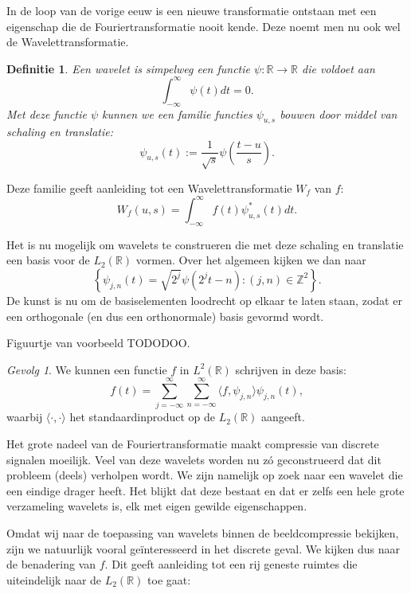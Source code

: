 \documentclass[11pt]{report}
\newcommand{\R}{\mathbb{R}}
\newcommand{\Z}{\mathbb{Z}}
\theoremstyle{plain}
\newtheorem*{definitie}{Definitie}
\theoremstyle{remark}
\newtheorem*{gevolg}{Gevolg}
\begin{document}
In de loop van de vorige eeuw is een nieuwe transformatie ontstaan met een eigenschap die de Fouriertransformatie nooit kende. Deze noemt men nu ook wel de Wavelettransformatie.

\begin{definitie}
Een wavelet is simpelweg een functie $\psi: \R \to \R$ die voldoet aan
\[
  \int_{-\infty}^{\infty} \psi(t) dt = 0.
\]
Met deze functie $\psi$ kunnen we een familie functies $\psi_{u,s}$ bouwen door middel van schaling en translatie:
\[
  \psi_{u,s}(t) := \frac{1}{\sqrt{s}} \psi\left(\frac{t-u}{s}\right).
\]
\end{definitie}

Deze familie geeft aanleiding tot een Wavelettransformatie $W_f$ van $f$:
\[
  W_f(u,s) = \int_{-\infty}^\infty f(t) \psi^*_{u,s}(t) dt.
\]

Het is nu mogelijk om wavelets te construeren die met deze schaling en translatie een basis voor de $L_2(\R)$ vormen. Over het algemeen kijken we dan naar
\[
  \left\{ \psi_{j,n}(t) = \sqrt{2^j} \psi\left( 2^j t - n\right) : (j,n) \in \Z^2 \right\}.
\]
De kunst is nu om de basiselementen loodrecht op elkaar te laten staan, zodat er een orthogonale (en dus een orthonormale) basis gevormd wordt. 

Figuurtje van voorbeeld TODODOO.

\begin{gevolg}We kunnen een functie $f$ in $L^2(\R)$ schrijven in deze basis:
\[
  f(t) = \sum_{j=-\infty}^{\infty} \sum_{n=-\infty}^{\infty} \langle f, \psi_{j,n} \rangle \psi_{j,n}(t),
\]
waarbij $\langle \cdot, \cdot \rangle$ het standaardinproduct op de $L_2(\R)$ aangeeft.
\end{gevolg}

Het grote nadeel van de Fouriertransformatie maakt compressie van discrete signalen moeilijk. Veel van deze wavelets worden nu z\'o geconstrueerd dat dit probleem (deels) verholpen wordt. We zijn namelijk op zoek naar een wavelet die een eindige drager heeft. Het blijkt dat deze bestaat en dat er zelfs een hele grote verzameling wavelets is, elk met eigen gewilde eigenschappen.

Omdat wij naar de toepassing van wavelets binnen de beeldcompressie bekijken, zijn we natuurlijk vooral ge\"interesseerd in het discrete geval. We kijken dus naar de benadering van $f$. Dit geeft aanleiding tot een rij geneste ruimtes die uiteindelijk naar de $L_2(\R)$ toe gaat:
\end{document}
